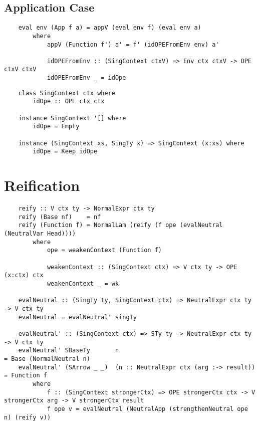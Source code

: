 \subsection{Application Case}


\begin{lstlisting}
    eval env (App f a) = appV (eval env f) (eval env a) 
        where
            appV (Function f') a' = f' (idOPEFromEnv env) a'

            idOPEFromEnv :: (SingContext ctxV) => Env ctx ctxV -> OPE ctxV ctxV
            idOPEFromEnv _ = idOpe 
\end{lstlisting}

\begin{lstlisting}
    class SingContext ctx where
        idOpe :: OPE ctx ctx

    instance SingContext '[] where
        idOpe = Empty

    instance (SingContext xs, SingTy x) => SingContext (x:xs) where
        idOpe = Keep idOpe
\end{lstlisting}


\section{Reification}

\begin{lstlisting}
    reify :: V ctx ty -> NormalExpr ctx ty
    reify (Base nf)    = nf
    reify (Function f) = NormalLam (reify (f ope (evalNeutral (NeutralVar Head)))) 
        where
            ope = weakenContext (Function f)

            weakenContext :: (SingContext ctx) => V ctx ty -> OPE (x:ctx) ctx
            weakenContext _ = wk 

    evalNeutral :: (SingTy ty, SingContext ctx) => NeutralExpr ctx ty -> V ctx ty
    evalNeutral = evalNeutral' singTy

    evalNeutral' :: (SingContext ctx) => STy ty -> NeutralExpr ctx ty -> V ctx ty
    evalNeutral' SBaseTy       n                                       = Base (NormalNeutral n)  
    evalNeutral' (SArrow _ _)  (n :: NeutralExpr ctx (arg :-> result)) = Function f 
        where
            f :: (SingContext strongerCtx) => OPE strongerCtx ctx -> V strongerCtx arg -> V strongerCtx result
            f ope v = evalNeutral (NeutralApp (strengthenNeutral ope n) (reify v))
\end{lstlisting}


